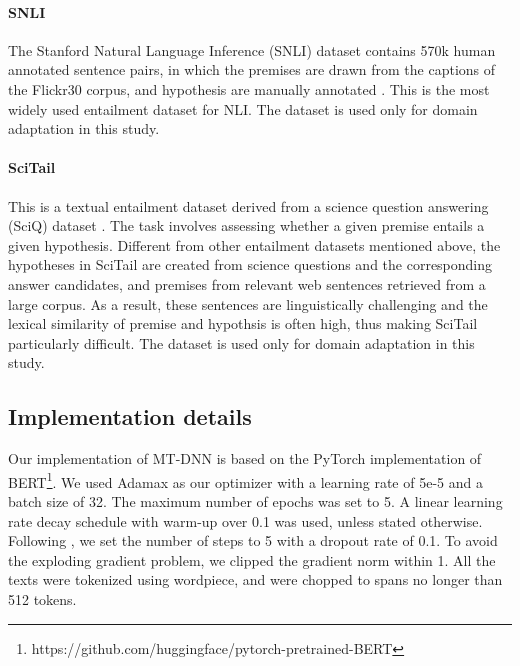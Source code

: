 \paragraph{SNLI}
The Stanford Natural Language Inference (SNLI) dataset contains 570k human annotated sentence pairs, in which the premises are drawn from the captions of the Flickr30 corpus, and hypothesis are manually annotated \cite{snli2015}. %
This is the most widely used entailment dataset for NLI.
The dataset is used only for domain adaptation in this study.

\paragraph{SciTail}
This is a textual entailment dataset derived from a science question answering (SciQ) dataset \cite{scitail}. The task involves assessing whether a given premise entails a given hypothesis.  
Different from other entailment datasets mentioned above, the hypotheses in SciTail are created from science questions and the corresponding answer candidates, and premises from relevant web sentences retrieved from a large corpus. As a result, these sentences are linguistically challenging and the lexical similarity of premise and hypothsis is often high, thus making SciTail particularly difficult. 
The dataset is used only for domain adaptation in this study.


\subsection{Implementation details}
\label{subsec:impl}
Our implementation of MT-DNN is based on the PyTorch implementation of BERT\footnote{https://github.com/huggingface/pytorch-pretrained-BERT}.
We used Adamax \cite{kingma2014adam} as our optimizer with a learning rate of 5e-5 and a batch size of 32. 
The maximum number of epochs was set to 5. 
A linear learning rate decay schedule with warm-up over 0.1 was used, unless stated otherwise. Following \cite{liu2018san4nli}, we set the number of steps to 5 with a dropout rate of 0.1. 
To avoid the exploding gradient problem, we clipped the gradient norm within 1. 
All the texts were tokenized using wordpiece, and were chopped to spans no longer than 512 tokens.

